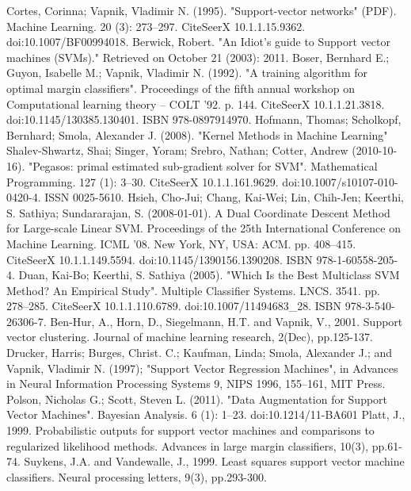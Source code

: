 \documentclass{article}
\begin{document}
\begin{thebibliography}{99}
Cortes, Corinna; Vapnik, Vladimir N. (1995). "Support-vector networks" (PDF). Machine Learning. 20 (3): 273–297. CiteSeerX 10.1.1.15.9362. doi:10.1007/BF00994018.
Berwick, Robert. "An Idiot’s guide to Support vector machines (SVMs)." Retrieved on October 21 (2003): 2011.
Boser, Bernhard E.; Guyon, Isabelle M.; Vapnik, Vladimir N. (1992). "A training algorithm for optimal margin classifiers". Proceedings of the fifth annual workshop on Computational learning theory – COLT '92. p. 144. CiteSeerX 10.1.1.21.3818. doi:10.1145/130385.130401. ISBN 978-0897914970.
Hofmann, Thomas; Scholkopf, Bernhard; Smola, Alexander J. (2008). "Kernel Methods in Machine Learning"
Shalev-Shwartz, Shai; Singer, Yoram; Srebro, Nathan; Cotter, Andrew (2010-10-16). "Pegasos: primal estimated sub-gradient solver for SVM". Mathematical Programming. 127 (1): 3–30. CiteSeerX 10.1.1.161.9629. doi:10.1007/s10107-010-0420-4. ISSN 0025-5610.
Hsieh, Cho-Jui; Chang, Kai-Wei; Lin, Chih-Jen; Keerthi, S. Sathiya; Sundararajan, S. (2008-01-01). A Dual Coordinate Descent Method for Large-scale Linear SVM. Proceedings of the 25th International Conference on Machine Learning. ICML '08. New York, NY, USA: ACM. pp. 408–415. CiteSeerX 10.1.1.149.5594. doi:10.1145/1390156.1390208. ISBN 978-1-60558-205-4.
Duan, Kai-Bo; Keerthi, S. Sathiya (2005). "Which Is the Best Multiclass SVM Method? An Empirical Study". Multiple Classifier Systems. LNCS. 3541. pp. 278–285. CiteSeerX 10.1.1.110.6789. doi:10.1007/11494683\_28. ISBN 978-3-540-26306-7.
Ben-Hur, A., Horn, D., Siegelmann, H.T. and Vapnik, V., 2001. Support vector clustering. Journal of machine learning research, 2(Dec), pp.125-137.
Drucker, Harris; Burges, Christ. C.; Kaufman, Linda; Smola, Alexander J.; and Vapnik, Vladimir N. (1997); "Support Vector Regression Machines", in Advances in Neural Information Processing Systems 9, NIPS 1996, 155–161, MIT Press.
Polson, Nicholas G.; Scott, Steven L. (2011). "Data Augmentation for Support Vector Machines". Bayesian Analysis. 6 (1): 1–23. doi:10.1214/11-BA601
Platt, J., 1999. Probabilistic outputs for support vector machines and comparisons to regularized likelihood methods. Advances in large margin classifiers, 10(3), pp.61-74.
Suykens, J.A. and Vandewalle, J., 1999. Least squares support vector machine classifiers. Neural processing letters, 9(3), pp.293-300.
\end{thebibliography}
\end{document}
